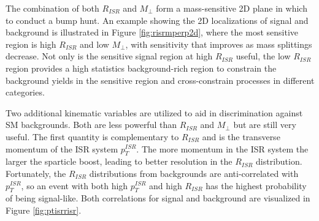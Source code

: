 
The combination of both $R_{ISR}$ and $M_\perp$ form a mass-sensitive 2D plane in which to conduct a bump hunt. An example showing the 2D localizations of signal and background is illustrated in Figure \ref{fig:risrmperp2d}, where the most sensitive region is high $R_{ISR}$ and low $M_\perp$, with sensitivity that improves as mass splittings decrease. Not only is the sensitive signal region at high $R_{ISR}$ useful, the low $R_{ISR}$ region provides a high statistics background-rich region to constrain the background yields in the sensitive region and cross-constrain processes in different categories. 



Two additional kinematic variables are utilized to aid in discrimination against SM backgrounds. Both are less powerful than $R_{ISR}$ and $M_\perp$ but are still very useful. The first quantity is complementary to $R_{ISR}$ and is the transverse momentum of the ISR system $p_T^{ISR}$. The more momentum in the ISR system the larger the sparticle boost, leading to better resolution in the $R_{ISR}$ distribution. Fortunately, the $R_{ISR}$ distributions from backgrounds are anti-correlated with $p_T^{ISR}$, so an event with both high  $p_T^{ISR}$ and high $R_{ISR}$ has the highest probability of being signal-like. Both correlations for signal and background are visualized in Figure \ref{fig:ptisrrisr}.


